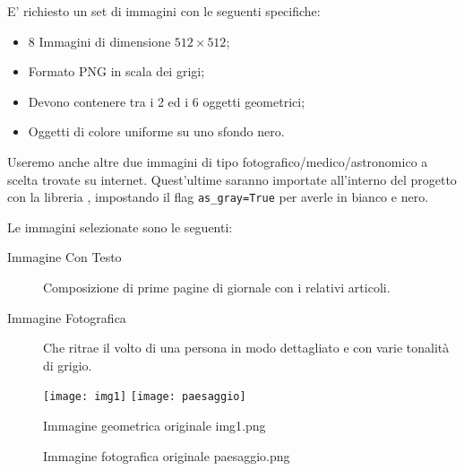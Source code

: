 E' richiesto un set di immagini con le seguenti specifiche: 
\begin{itemize}
    \item 8 Immagini di dimensione $512 \times 512$;
    \item Formato PNG in scala dei grigi;
    \item Devono contenere tra i 2 ed i 6 oggetti geometrici;
    \item Oggetti di colore uniforme su uno sfondo nero.
\end{itemize}


Useremo anche altre due immagini di tipo fotografico/medico/astronomico a scelta trovate su internet.
Quest'ultime saranno importate all'interno del progetto con la libreria , impostando il flag \verb|as_gray=True| per averle in bianco e nero.

Le immagini selezionate sono le seguenti:
\begin{description}
    \item[Immagine Con Testo] Composizione di prime pagine di giornale con i relativi articoli.
    \item[Immagine Fotografica] Che ritrae il volto di una persona in modo dettagliato e con varie tonalità di grigio.
\end{description}

\begin{figure}
    \centering
    \subfigure
    \texttt{[image: img1]}\hfil
    \texttt{[image: paesaggio]}
    \caption{Immagine geometrica originale img1.png}
    \label{fig:img1}
    \caption{Immagine fotografica originale paesaggio.png}
    \label{fig:paesaggio}
\end{figure}
